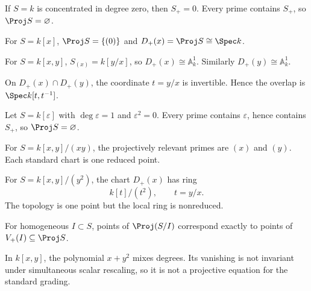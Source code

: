 \begin{example}\label{ex:vi35-01}
If \(S=k\) is concentrated in degree zero, then \(S_+=0\). Every prime contains \(S_+\), so \(\Proj S=\varnothing\).
\end{example}

\begin{example}\label{ex:vi35-02}
For \(S=k[x]\), \(\Proj S=\{(0)\}\) and \(D_+(x)=\Proj S\cong\Spec k\).
\end{example}

\begin{example}\label{ex:vi35-03}
For \(S=k[x,y]\), \(S_{(x)}=k[y/x]\), so \(D_+(x)\cong\mathbb A^1_k\).  Similarly \(D_+(y)\cong\mathbb A^1_k\).
\end{example}

\begin{example}\label{ex:vi35-04}
On \(D_+(x)\cap D_+(y)\), the coordinate \(t=y/x\) is invertible.  Hence the overlap is \(\Spec k[t,t^{-1}]\).
\end{example}

\begin{example}\label{ex:vi35-05}
Let \(S=k[\varepsilon]\) with \(\deg\varepsilon=1\) and \(\varepsilon^2=0\).  Every prime contains \(\varepsilon\), hence contains \(S_+\), so \(\Proj S=\varnothing\).
\end{example}

\begin{example}\label{ex:vi35-06}
For \(S=k[x,y]/(xy)\), the projectively relevant primes are \((x)\) and \((y)\).  Each standard chart is one reduced point.
\end{example}

\begin{example}\label{ex:vi35-07}
For \(S=k[x,y]/(y^2)\), the chart \(D_+(x)\) has ring
\[
k[t]/(t^2),\qquad t=y/x.
\]
The topology is one point but the local ring is nonreduced.
\end{example}

\begin{example}\label{ex:vi35-08}
For homogeneous \(I\subset S\), points of \(\Proj(S/I)\) correspond exactly to points of \(V_+(I)\subseteq\Proj S\).
\end{example}

\begin{example}\label{ex:vi35-09}
In \(k[x,y]\), the polynomial \(x+y^2\) mixes degrees. Its vanishing is not invariant under simultaneous scalar rescaling, so it is not a projective equation for the standard grading.
\end{example}

